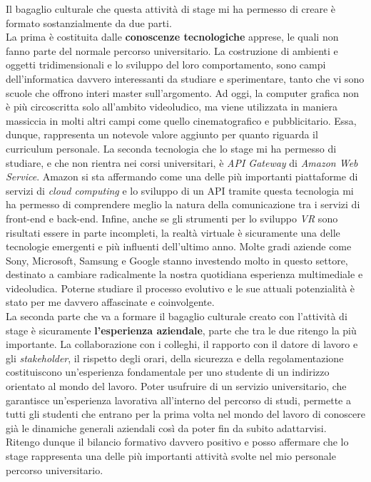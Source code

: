 Il bagaglio culturale che questa attività di stage mi ha permesso di creare è formato sostanzialmente da due parti. \\
La prima è costituita dalle \textbf{conoscenze tecnologiche} apprese, le quali non fanno parte del normale percorso universitario. La costruzione di ambienti e oggetti tridimensionali e lo sviluppo del loro comportamento, sono campi dell'informatica davvero interessanti da studiare e sperimentare, tanto che vi sono scuole che offrono interi master sull'argomento. Ad oggi, la computer grafica non è più circoscritta solo all'ambito videoludico, ma viene utilizzata in maniera massiccia in molti altri campi come quello cinematografico e pubblicitario. Essa, dunque, rappresenta un notevole valore aggiunto per quanto riguarda il curriculum personale. La seconda tecnologia che lo stage mi ha permesso di studiare, e che non rientra nei corsi universitari, è \textit{API Gateway} di \textit{Amazon Web Service}. Amazon si sta affermando come una delle più importanti piattaforme di servizi di \textit{cloud computing}\hyperlink{cc}{} e lo sviluppo di un API tramite questa tecnologia mi ha permesso di comprendere meglio la natura della comunicazione tra i servizi di front-end e back-end. Infine, anche se gli strumenti per lo sviluppo \textit{VR} sono risultati essere in parte incompleti, la realtà virtuale è sicuramente una delle tecnologie emergenti e più influenti dell'ultimo anno. Molte gradi aziende come Sony, Microsoft, Samsung e Google stanno investendo molto in questo settore, destinato a cambiare radicalmente la nostra quotidiana esperienza multimediale e videoludica. Poterne studiare il processo evolutivo e le sue attuali potenzialità è stato per me davvero affascinate e coinvolgente. \\
La seconda parte che va a formare il bagaglio culturale creato con l'attività di stage è sicuramente \textbf{l'esperienza aziendale}, parte che tra le due ritengo la più importante. La collaborazione con i colleghi, il rapporto con il datore di lavoro e gli \textit{stakeholder}\hyperlink{sh}{}, il rispetto degli orari, della sicurezza e della regolamentazione costituiscono un'esperienza fondamentale per uno studente di un indirizzo orientato al mondo del lavoro. Poter usufruire di un servizio universitario, che garantisce un'esperienza lavorativa all'interno del percorso di studi, permette a tutti gli studenti che entrano per la prima volta nel mondo del lavoro di conoscere già le dinamiche generali aziendali così da poter fin da subito adattarvisi. \\
Ritengo dunque il bilancio formativo davvero positivo e posso affermare che lo stage rappresenta una delle più importanti attività svolte nel mio personale percorso universitario.

